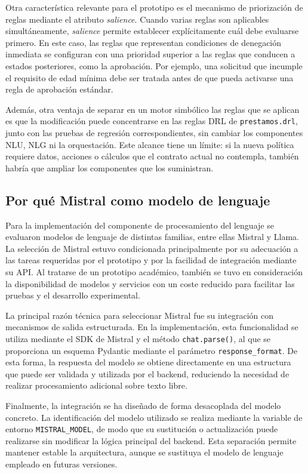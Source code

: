 \documentclass[12pt,a4paper]{report}
\begin{document}
Otra característica relevante para el prototipo es el mecanismo de priorización de reglas mediante el atributo \textit{salience}. Cuando varias reglas son aplicables simultáneamente, \textit{salience} permite establecer explícitamente cuál debe evaluarse primero. En este caso, las reglas que representan condiciones de denegación inmediata se configuran con una prioridad superior a las reglas que conducen a estados posteriores, como la aprobación. Por ejemplo, una solicitud que incumple el requisito de edad mínima debe ser tratada antes de que pueda activarse una regla de aprobación estándar.

Además, otra ventaja de separar en un motor simbólico las reglas que se aplican es que la modificación puede concentrarse en las reglas DRL de \texttt{prestamos.drl}, junto con las pruebas de regresión correspondientes, sin cambiar los componentes NLU, NLG ni la orquestación. Este alcance tiene un límite: si la nueva política requiere datos, acciones o cálculos que el contrato actual no contempla, también habría que ampliar los componentes que los suministran.

\subsection{Por qué Mistral como modelo de lenguaje}

Para la implementación del componente de procesamiento del lenguaje se evaluaron modelos de lenguaje de distintas familias, entre ellas Mistral y Llama. La selección de Mistral estuvo condicionada principalmente por su adecuación a las tareas requeridas por el prototipo y por la facilidad de integración mediante su API. Al tratarse de un prototipo académico, también se tuvo en consideración la disponibilidad de modelos y servicios con un coste reducido para facilitar las pruebas y el desarrollo experimental.

La principal razón técnica para seleccionar Mistral fue su integración con mecanismos de salida estructurada. En la implementación, esta funcionalidad se utiliza mediante el SDK de Mistral y el método \texttt{chat.parse()}, al que se proporciona un esquema Pydantic mediante el parámetro \texttt{response\_format}. De esta forma, la respuesta del modelo se obtiene directamente en una estructura que puede ser validada y utilizada por el backend, reduciendo la necesidad de realizar procesamiento adicional sobre texto libre.

Finalmente, la integración se ha diseñado de forma desacoplada del modelo concreto. La identificación del modelo utilizado se realiza mediante la variable de entorno \texttt{MISTRAL\_MODEL}, de modo que su sustitución o actualización puede realizarse sin modificar la lógica principal del backend. Esta separación permite mantener estable la arquitectura, aunque se sustituya el modelo de lenguaje empleado en futuras versiones.
\end{document}
